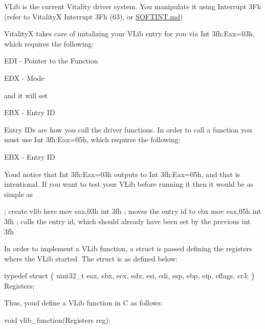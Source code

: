 V\+Lib is the current Vitality driver system. You manipulate it using Interrupt 3\+Fh (refer to VitalityX Interrupt 3\+Fh (63), or \hyperlink{a00008}{S\+O\+F\+T\+I\+N\+T.\+md})

VitalityX takes care of initalizing your V\+Lib entry for you via Int 3fh\+:Eax=03h, which requires the following\+:


\begin{DoxyItemize}
\item E\+DI -\/ Pointer to the Function
\item E\+DX -\/ Mode
\end{DoxyItemize}

and it will set


\begin{DoxyItemize}
\item E\+BX -\/ Entry ID
\end{DoxyItemize}

Entry ID\textquotesingle{}s are how you call the driver functions. In order to call a function you must use Int 3fh\+:Eax=05h, which requires the following\+:


\begin{DoxyItemize}
\item E\+BX -\/ Entry ID
\end{DoxyItemize}

You\textquotesingle{}d notice that Int 3fh\+:Eax=03h outputs to Int 3fh\+:Eax=05h, and that is intentional. If you want to test your V\+Lib before running it then it would be as simple as 
\begin{DoxyCode}
; create vlib here
mov eax,03h
int 3fh ; moves the entry id to ebx
mov eax,05h
int 3fh ; calls the entry id, which should already have been set by the previous int 3fh
\end{DoxyCode}


In order to implement a V\+Lib function, a struct is passed defining the registers where the V\+Lib started. The struct is as defined below\+:


\begin{DoxyCode}
typedef struct \{
    uint32\_t eax, ebx, ecx, edx, esi, edi, esp, ebp, eip, eflags, cr3;
\} Registers;
\end{DoxyCode}


Thus, youd define a V\+Lib function in C as follows\+: 
\begin{DoxyCode}
void vlib\_function(Registers reg);
\end{DoxyCode}
 